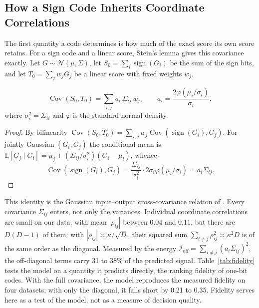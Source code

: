 \documentclass[twoside,11pt]{article}
\newcommand{\E}{\mathbb{E}}
\newcommand{\Cov}{\operatorname{Cov}}
\newcommand{\sign}{\operatorname{sign}}
\begin{document}
\subsection{How a Sign Code Inherits Coordinate Correlations}
\label{sec:stein}

The first quantity a code determines is how much of the exact score its own score retains. For a sign code and a linear score, Stein's lemma gives this covariance exactly. Let $G\sim\mathcal N(\mu,\Sigma)$, let $S_0=\sum_i\sign(G_i)$ be the sum of the sign bits, and let $T_0=\sum_jw_jG_j$ be a linear score with fixed weights $w_j$.

\begin{theorem}
\label{thm:stein}
\begin{equation}
\Cov(S_0,T_0)=\sum_{i,j}a_i\,\Sigma_{ij}\,w_j,\qquad a_i=\frac{2\varphi(\mu_i/\sigma_i)}{\sigma_i},
\end{equation}
where $\sigma_i^2=\Sigma_{ii}$ and $\varphi$ is the standard normal density.
\end{theorem}

\begin{proof}
By bilinearity $\Cov(S_0,T_0)=\sum_{i,j}w_j\Cov(\sign(G_i),G_j)$. For jointly Gaussian $(G_i,G_j)$ the conditional mean is $\E[G_j\mid G_i]=\mu_j+(\Sigma_{ij}/\sigma_i^2)(G_i-\mu_i)$, whence
\[
\Cov(\sign(G_i),G_j)=\frac{\Sigma_{ij}}{\sigma_i^2}\cdot2\sigma_i\varphi(\mu_i/\sigma_i)=a_i\Sigma_{ij}.
\]
\end{proof}

This identity is the Gaussian input--output cross-covariance relation of \citet{bussgang1952crosscorrelation}. Every covariance $\Sigma_{ij}$ enters, not only the variances. Individual coordinate correlations are small on our data, with mean $|\rho_{ij}|$ between 0.04 and 0.11, but there are $D(D-1)$ of them: with $|\rho_{ij}|\asymp\kappa/\sqrt D$, their squared sum $\sum_{i\ne j}\rho_{ij}^2\asymp\kappa^2D$ is of the same order as the diagonal. Measured by the energy $\mathcal I_{\mathrm{off}}=\sum_{i\ne j}(a_i\Sigma_{ij})^2$, the off-diagonal terms carry 31 to 38\% of the predicted signal. Table~\ref{tab:fidelity} tests the model on a quantity it predicts directly, the ranking fidelity of one-bit codes. With the full covariance, the model reproduces the measured fidelity on four datasets; with only the diagonal, it falls short by 0.21 to 0.35. Fidelity serves here as a test of the model, not as a measure of decision quality.
\end{document}
